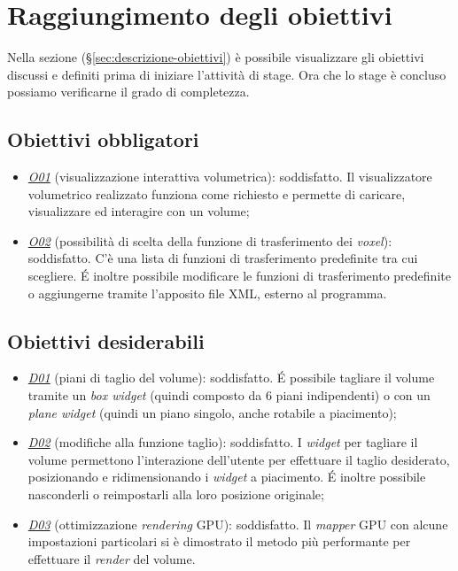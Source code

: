 \section{Raggiungimento degli obiettivi}
Nella sezione  (§\ref{sec:descrizione-obiettivi}) è possibile visualizzare gli obiettivi discussi e definiti prima di iniziare l'attività di stage. Ora che lo stage è concluso possiamo verificarne il grado di completezza.

\subsection{Obiettivi obbligatori}
\begin{itemize}
\item \underline{\textit{O01}} (visualizzazione interattiva volumetrica): soddisfatto. Il visualizzatore volumetrico realizzato funziona come richiesto e permette di caricare, visualizzare ed interagire con un volume;
\item \underline{\textit{O02}} (possibilità di scelta della funzione di trasferimento dei \emph{voxel}): soddisfatto. C'è una lista di funzioni di trasferimento predefinite tra cui scegliere. \'E inoltre possibile modificare le funzioni di trasferimento predefinite o aggiungerne tramite l'apposito file XML, esterno al programma.
\end{itemize}

\subsection{Obiettivi desiderabili}
\begin{itemize}
\item \underline{\textit{D01}} (piani di taglio del volume): soddisfatto. \'E possibile tagliare il volume tramite un \emph{box widget} (quindi composto da 6 piani indipendenti) o con un \emph{plane widget} (quindi un piano singolo, anche rotabile a piacimento);
\item \underline{\textit{D02}} (modifiche alla funzione taglio): soddisfatto. I \emph{widget} per tagliare il volume permettono l'interazione dell'utente per effettuare il taglio desiderato, posizionando e ridimensionando i \emph{widget} a piacimento. \'E inoltre possibile nasconderli o reimpostarli alla loro posizione originale;
\item \underline{\textit{D03}} (ottimizzazione \emph{rendering} GPU): soddisfatto. Il \emph{mapper} GPU con alcune impostazioni particolari si è dimostrato il metodo più performante per effettuare il \emph{render} del volume.
\end{itemize}

